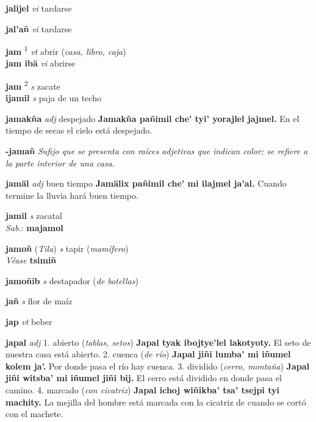 \documentclass[10pt]{scrbook}
\newcommand{\entry}[1]{\textbf{#1}}
\newcommand{\onedefinition}[1]{#1.}
\newcommand{\defsuperscript}[1]{\textsuperscript{#1}}
\newcommand{\nontranslationdef}[1]{\textit{#1}}
\newcommand{\partofspeech}[1]{\textit{#1}}
\newcommand{\spanishtranslation}[1]{#1}
\newcommand{\clarification}[1]{(\textit{#1})}
\newcommand{\cholexample}[1]{\textbf{#1}}
\newcommand{\exampletranslation}[1]{#1}
\newcommand{\dialectvariant}[1]{\\\textit{#1}:}
\newcommand{\dialectword}[1]{\textbf{#1}}
\newcommand{\alsosee}[1]{\\\textit{Véase} \textbf{#1}}
\newcommand{\relevantdialect}[1]{(\textit{#1})}
\newcommand{\secondaryentry}[1]{\\\textbf{#1}}
\newcommand{\secondpartofspeech}[1]{\textit{#1}}
\newcommand{\secondtranslation}[1]{#1}
\begin{document}
\begin{multicols}{2}
\entry{jalijel}
\partofspeech{vi}
\spanishtranslation{tardarse}

\entry{jal'añ}
\partofspeech{vi}
\spanishtranslation{tardarse}

\entry{jam}
\defsuperscript{1}
\partofspeech{vt}
\spanishtranslation{abrir}
\clarification{casa, libro, caja}
\secondaryentry{jam ibä}
\secondpartofspeech{vi}
\secondtranslation{abrirse}

\entry{jam}
\defsuperscript{2}
\partofspeech{s}
\spanishtranslation{zacate}
\secondaryentry{ijamil}
\secondpartofspeech{s}
\secondtranslation{paja de un techo}

\entry{jamakña}
\partofspeech{adj}
\spanishtranslation{despejado}
\cholexample{Jamakña pañimil che' tyi' yorajlel jajmel.}
\exampletranslation{En el tiempo de secas el cielo está despejado.}

\entry{-jamañ}
\nontranslationdef{Sufijo que se presenta con raíces adjetivas que indican color; se refiere a la parte interior de una casa.}

\entry{jamäl}
\partofspeech{adj}
\spanishtranslation{buen tiempo}
\cholexample{Jamälix pañimil che' mi ilajmel ja'al.}
\exampletranslation{Cuando termine la lluvia hará buen tiempo.}

\entry{jamil}
\partofspeech{s}
\spanishtranslation{zacatal}
\dialectvariant{Sab.}
\dialectword{majamol}

\entry{jamoñ}
\relevantdialect{Tila}
\partofspeech{s}
\spanishtranslation{tapir}
\clarification{mamífero}
\alsosee{tsimiñ}

\entry{jamoñib}
\partofspeech{s}
\spanishtranslation{destapador}
\clarification{de botellas}

\entry{jañ}
\partofspeech{s}
\spanishtranslation{flor de maíz}

\entry{jap}
\partofspeech{vt}
\spanishtranslation{beber}

\entry{japal}
\partofspeech{adj}
\onedefinition{1}
\spanishtranslation{abierto}
\clarification{tablas, setos}
\cholexample{Japal tyak ibojtye'lel lakotyoty.}
\exampletranslation{El seto de nuestra casa está abierto.}
\onedefinition{2}
\spanishtranslation{cuenca}
\clarification{de río}
\cholexample{Japal jiñi lumba' mi iñumel kolem ja'.}
\exampletranslation{Por donde pasa el río hay cuenca.}
\onedefinition{3}
\spanishtranslation{dividido}
\clarification{cerro, montaña}
\cholexample{Japal jiñi witsba' mi iñumel jiñi bij.}
\exampletranslation{El cerro está dividido en donde pasa el camino.}
\onedefinition{4}
\spanishtranslation{marcado}
\clarification{con cicatriz}
\cholexample{Japal ichoj wiñikba' tsa' tsejpi tyi machity.}
\exampletranslation{La mejilla del hombre está marcada con la cicatriz de cuando se cortó con el machete.}


\end{multicols}
\end{document}
